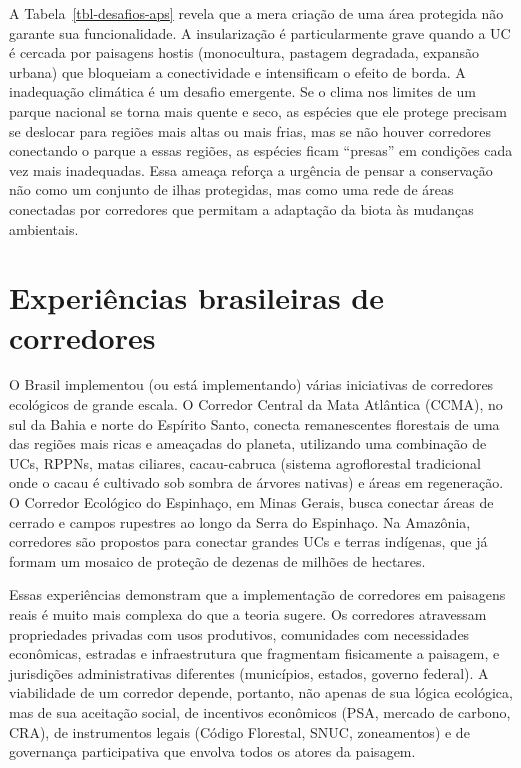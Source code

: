 \documentclass[
  portuguese,
  11pt,
  a4paper,
  open=any]{scrbook}
\begin{document}
A Tabela~\ref{tbl-desafios-aps} revela que a mera criação de uma área
protegida não garante sua funcionalidade. A insularização é
particularmente grave quando a UC é cercada por paisagens hostis
(monocultura, pastagem degradada, expansão urbana) que bloqueiam a
conectividade e intensificam o efeito de borda. A inadequação climática
é um desafio emergente. Se o clima nos limites de um parque nacional se
torna mais quente e seco, as espécies que ele protege precisam se
deslocar para regiões mais altas ou mais frias, mas se não houver
corredores conectando o parque a essas regiões, as espécies ficam
``presas'' em condições cada vez mais inadequadas. Essa ameaça reforça a
urgência de pensar a conservação não como um conjunto de ilhas
protegidas, mas como uma rede de áreas conectadas por corredores que
permitam a adaptação da biota às mudanças ambientais.

\section{Experiências brasileiras de
corredores}\label{experiuxeancias-brasileiras-de-corredores}

O Brasil implementou (ou está implementando) várias iniciativas de
corredores ecológicos de grande escala. O Corredor Central da Mata
Atlântica (CCMA), no sul da Bahia e norte do Espírito Santo, conecta
remanescentes florestais de uma das regiões mais ricas e ameaçadas do
planeta, utilizando uma combinação de UCs, RPPNs, matas ciliares,
cacau-cabruca (sistema agroflorestal tradicional onde o cacau é
cultivado sob sombra de árvores nativas) e áreas em regeneração. O
Corredor Ecológico do Espinhaço, em Minas Gerais, busca conectar áreas
de cerrado e campos rupestres ao longo da Serra do Espinhaço. Na
Amazônia, corredores são propostos para conectar grandes UCs e terras
indígenas, que já formam um mosaico de proteção de dezenas de milhões de
hectares.

Essas experiências demonstram que a implementação de corredores em
paisagens reais é muito mais complexa do que a teoria sugere. Os
corredores atravessam propriedades privadas com usos produtivos,
comunidades com necessidades econômicas, estradas e infraestrutura que
fragmentam fisicamente a paisagem, e jurisdições administrativas
diferentes (municípios, estados, governo federal). A viabilidade de um
corredor depende, portanto, não apenas de sua lógica ecológica, mas de
sua aceitação social, de incentivos econômicos (PSA, mercado de carbono,
CRA), de instrumentos legais (Código Florestal, SNUC, zoneamentos) e de
governança participativa que envolva todos os atores da paisagem.
\end{document}
